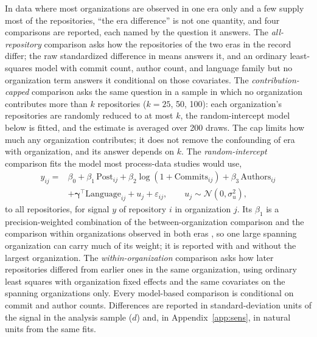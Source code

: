\documentclass[acmsmall,screen,review,anonymous]{acmart}
\begin{document}
In data where most organizations are observed in one era only and a few supply most of the repositories, ``the era difference'' is not one quantity, and four comparisons are reported, each named by the question it answers. The \textit{all-repository} comparison asks how the repositories of the two eras in the record differ; the raw standardized difference in means answers it, and an ordinary least-squares model with commit count, author count, and language family but no organization term answers it conditional on those covariates. The \textit{contribution-capped} comparison asks the same question in a sample in which no organization contributes more than $k$ repositories ($k = 25$, 50, 100): each organization's repositories are randomly reduced to at most $k$, the random-intercept model below is fitted, and the estimate is averaged over 200 draws. The cap limits how much any organization contributes; it does not remove the confounding of era with organization, and its answer depends on $k$. The \textit{random-intercept} comparison fits the model most process-data studies would use,
\begin{equation}
\begin{split}
y_{ij} = {}& \beta_0 + \beta_1\,\mathrm{Post}_{ij} + \beta_2 \log(1 + \mathrm{Commits}_{ij}) + \beta_3\,\mathrm{Authors}_{ij} \\
& + \boldsymbol{\gamma}^\top \mathrm{Language}_{ij} + u_j + \varepsilon_{ij}, \qquad u_j \sim \mathcal{N}(0, \sigma_u^2),
\end{split}
\label{eq:era}
\end{equation}
to all repositories, for signal $y$ of repository $i$ in organization $j$. Its $\beta_1$ is a precision-weighted combination of the between-organization comparison and the comparison within organizations observed in both eras \citep{enders2007centering}, so one large spanning organization can carry much of its weight; it is reported with and without the largest organization. The \textit{within-organization} comparison asks how later repositories differed from earlier ones in the same organization, using ordinary least squares with organization fixed effects and the same covariates on the spanning organizations only. Every model-based comparison is conditional on commit and author counts. Differences are reported in standard-deviation units of the signal in the analysis sample ($d$) and, in Appendix~\ref{app:sens}, in natural units from the same fits.
\end{document}

